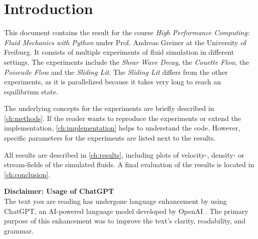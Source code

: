 \chapter{Introduction}

This document contains the result for the course \textit{High Performance Computing: Fluid Mechanics with Python} under Prof. Andreas Greiner at the University of Freiburg.
It consists of multiple experiments of fluid simulation in different settings.
The experiments include the \textit{Shear Wave Decay}, the \textit{Couette Flow}, the \textit{Poiseuile Flow} and the \textit{Sliding Lit}.
The \textit{Sliding Lit} differs from the other experiments, as it is parallelized because it takes very long to reach an equilibrium state.
\newline

The underlying concepts for the experiments are briefly described in \cref{ch:methods}.
If the reader wants to reproduce the experiments or extend the implementation, \cref{ch:implementation} helps to understand the code.
However, specific parameters for the experiments are listed next to the results.
\newline

All results are described in \cref{ch:results}, including plots of velocity-, density- or stream-fields of the simulated fluids.
A final evaluation of the results is located in \cref{ch:conclusion}.


\vspace{1cm}
\begin{tcolorbox}[colback=blue!20,%
    colframe=black,%
    width=\linewidth,%
    arc=3mm, auto outer arc,
]
    \begin{centering}
        \textbf{Disclaimer: Usage of ChatGPT} \vspace{0.2cm} \\
        The text you are reading has undergone language enhancement by using ChatGPT, an AI-powered language model developed by OpenAI \cite{ChatGPT}.
        The primary purpose of this enhancement was to improve the text's clarity, readability, and grammar.
    \end{centering}
\end{tcolorbox}
